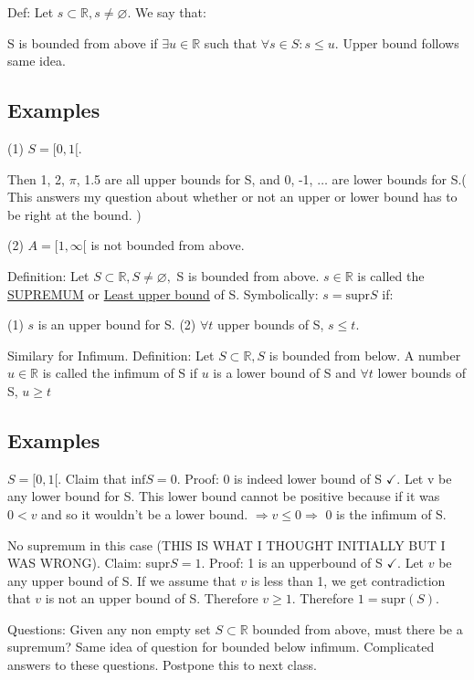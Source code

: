 \documentclass[class=scrartcl, crop=false]{standalone}
\begin{document}
Def: Let $s \subset \mathbb{R}, s \neq \varnothing$. We say that:

S is bounded from above if $\exists u \in \mathbb{R}$ such that $\forall s \in S: s \leq u$. Upper bound follows same idea.

\subsection{Examples}

(1) $S = [0, 1[$.

Then 1, 2, $\pi$, 1.5 are all upper bounds for S, and 0, -1, $\dots$ are lower bounds for S.( This answers my question about whether or not an upper or lower bound has to be right at the bound. )

(2) $A = [1, \infty[$ is not bounded from above. 

Definition: Let $S \subset \mathbb{R}, S \neq \varnothing,$ S is bounded from above. $s \in \mathbb{R}$ is called the \underline{SUPREMUM} or \underline{Least upper bound} of S. Symbolically: $s = \text{supr}S$ if:

(1) $s$ is an upper bound for S.
(2) $\forall t$ upper bounds of S, $s \leq t$.

Similary for Infimum. Definition: Let $S \subset \mathbb{R}, S$ is bounded from below. A number $u \in \mathbb{R}$ is called the infimum of S if $u$ is a lower bound of S and $\forall t$ lower bounds of S, $u \geq t$

\subsection{Examples}

$S = [0, 1[$. Claim that $\text{inf}S = 0$. Proof: 0 is indeed lower bound of S $\checkmark$. Let v be any lower bound for S. This lower bound cannot be positive because if it was $0 < v$ and so it wouldn't be  a lower bound. $\Rightarrow v \leq 0 \Rightarrow$ 0 is the infimum of S.

No supremum in this case (THIS IS WHAT I THOUGHT INITIALLY BUT I WAS WRONG). Claim: supr$S = 1$. Proof: 1 is an upperbound of S  $\checkmark$. Let $v$ be any upper bound of S. If we assume that $v$ is less than 1, we get contradiction that $v$ is not an upper bound of S. Therefore $v \geq 1$. Therefore $1 = \text{supr}(S)$.

Questions: Given any non empty set $S \subset \mathbb{R}$ bounded from above, must there be a supremum? Same idea of question for bounded below infimum. Complicated answers to these questions. Postpone this to next class.
\end{document}
